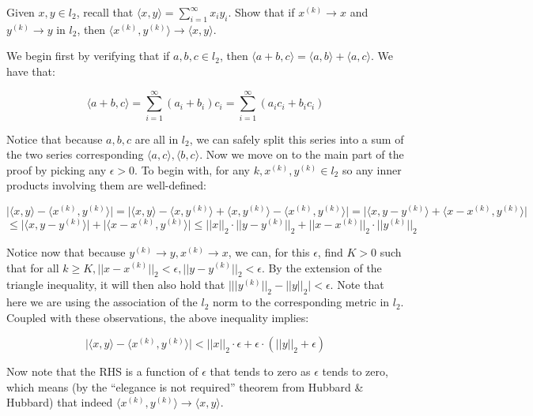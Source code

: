 \begin{exercise}{41}
    Given $x, y \in l_2$, recall that $\langle x, y \rangle = \sum_{i=1}^{\infty} x_i y_i$.
    Show that if $x^{(k)} \rightarrow x$ and $y^{(k)} \rightarrow y$ in $l_2$, then $\langle x^{(k)}, y^{(k)} \rangle \rightarrow \langle x, y \rangle$.
\end{exercise}

\begin{solution}
    
    We begin first by verifying that if $a, b, c \in l_2$, then $\langle a + b, c \rangle = \langle a, b \rangle + \langle a, c \rangle$.
    We have that:

    $$\langle a + b, c \rangle = \sum_{i=1}^{\infty}(a_i + b_i)c_i = \sum_{i=1}^{\infty}(a_ic_i + b_ic_i)$$

    Notice that because $a, b, c$ are all in $l_2$, we can safely split this series into a sum of the two series corresponding $\langle a, c \rangle, \langle b, c \rangle$.
    Now we move on to the main part of the proof by picking any $\epsilon > 0$.
    To begin with, for any $k, x^{(k)}, y^{(k)} \in l_2$ so any inner products involving them are well-defined:

    $$\lvert \langle x, y \rangle - \langle x^{(k)}, y^{(k)} \rangle \rvert = \lvert \langle x, y \rangle - \langle x, y^{(k)} \rangle + \langle x, y^{(k)} \rangle - \langle x^{(k)}, y^{(k)} \rangle \rvert = \lvert \langle x, y - y^{(k)} \rangle + \langle x - x^{(k)}, y^{(k)} \rangle \rvert$$
    $$\leq \lvert \langle x, y - y^{(k)} \rangle \rvert + \lvert \langle x - x^{(k)}, y^{(k)} \rangle \rvert \leq \lvert \lvert x \rvert \rvert_2 \cdot \lvert \lvert y - y^{(k)} \rvert \rvert_2 + \lvert \lvert x - x^{(k)} \rvert \rvert_2 \cdot \lvert \lvert y^{(k)} \rvert \rvert_2$$

    Notice now that because $y^{(k)} \rightarrow y, x^{(k)} \rightarrow x$, we can, for this $\epsilon$, find $K > 0$ such that for all $k \geq K, \lvert \lvert x - x^{(k)} \rvert \rvert_2 < \epsilon, \lvert \lvert y - y^{(k)} \rvert \rvert_2 < \epsilon$.
    By the extension of the triangle inequality, it will then also hold that $\bigl \lvert \lvert \lvert y^{(k)} \rvert \rvert_2 - \lvert \lvert y \rvert \rvert_2 \bigr \rvert < \epsilon$.
    Note that here we are using the association of the $l_2$ norm to the corresponding metric in $l_2$.
    Coupled with these observations, the above inequality implies:

    $$\lvert \langle x, y \rangle - \langle x^{(k)}, y^{(k)} \rangle \rvert < \lvert \lvert x \rvert \rvert_2 \cdot \epsilon + \epsilon \cdot (\lvert \lvert y \rvert \rvert_2 + \epsilon)$$

    Now note that the RHS is a function of $\epsilon$ that tends to zero as $\epsilon$ tends to zero, which means (by the ``elegance is not required'' theorem from Hubbard \& Hubbard) that indeed $\langle x^{(k)}, y^{(k)} \rangle \rightarrow \langle x, y \rangle$.
\end{solution}

